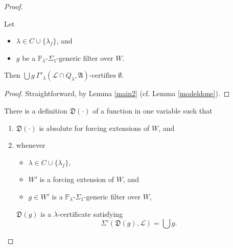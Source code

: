 \documentclass[12pt]{article}
\numberwithin{equation}{section}
\begin{document}
\begin{proof}
\begin{lem}\label{modeldone2}
Let 
\begin{itemize}
    \item $\lambda \in C \cup \{\lambda_f\}$, and
    \item $g$ be a $\mathbb{P}_{\lambda}$-$\Sigma_1$-generic filter over $W$.
\end{itemize}
Then $\bigcup g \ \Gamma'_{\lambda} (\mathcal{L} \cap Q_{\lambda}, \mathfrak{A}) \text{-certifies } \emptyset$.
\end{lem}

\begin{proof}
Straightforward, by Lemma \ref{main2} (cf. Lemma \ref{modeldone}).
\end{proof}

\begin{lem}\label{lem446}
There is a definition $\mathfrak{D}(\cdot)$ of a function in one variable such that
\begin{enumerate}[label=(\arabic*)]
    \item\label{4461} $\mathfrak{D}(\cdot)$ is absolute for forcing extensions of $W$, and
    \item\label{4462} whenever
    \begin{itemize}
        \item $\lambda \in C \cup \{\lambda_f\}$, 
        \item $W'$ is a forcing extension of $W$, and
        \item $g \in W'$ is a $\mathbb{P}_{\lambda}$-$\Sigma_1$-generic filter over $W$,
    \end{itemize}
    $\mathfrak{D}(g)$ is a $\lambda$-certificate satisfying 
    \begin{equation*}
        \Sigma'(\mathfrak{D}(g), \mathcal{L}) = \bigcup g \text{.}
    \end{equation*} 
\end{enumerate} 
\end{lem}


\end{proof}
\end{document}

